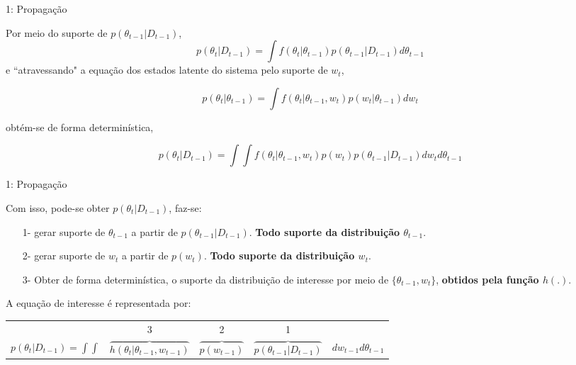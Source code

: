 \documentclass{beamer}
\begin{document}
\begin{frame}{1: Propagação}

Por meio do suporte de $p(\theta_{t-1}|D_{t-1})$,
$$
p(\theta_t|D_{t-1}) = \int f(\theta_t|\theta_{t-1})p(\theta_{t-1}|D_{t-1})d\theta_{t-1}
$$
\pause
e ``atravessando" a equação dos estados latente do sistema pelo suporte de $w_t$, 

$$
p(\theta_t|\theta_{t-1}) = \int f(\theta_t|\theta_{t-1},w_{t})p(w_{t}|\theta_{t-1})dw_{t}
$$
\pause

obtém-se de forma determinística,

$$
p(\theta_t|D_{t-1}) = \int \int f(\theta_t|\theta_{t-1},w_{t})p(w_{t})p(\theta_{t-1}|D_{t-1})dw_{t}d\theta_{t-1}
$$


\end{frame}



\begin{frame}{1: Propagação}


Com isso, pode-se obter $p(\theta_t|D_{t-1})$, faz-se:
\pause
\begin{itemize}
\item[1-] gerar suporte de  $\theta_{t-1}$ a partir de $p(\theta_{t-1}|D_{t-1})$. \textbf{Todo suporte da distribuição $\theta_{t-1}$}.

\pause


\item[2-] gerar suporte de $w_{t}$ a partir de $p(w_{t})$. \textbf{Todo suporte da distribuição $w_{t}$}.

\pause

\item[3-]  Obter de forma determinística, o suporte da distribuição de interesse por meio de $\{\theta_{t-1},w_{t}\}$,  \textbf{obtidos pela função $h(.)$}.
\end{itemize}

\pause


A equação de interesse é representada por:
\begin{small}

\begin{tabular}{ccccc}
 & 3 & 2 & 1 & \\
$p(\theta_t|D_{t-1}) = \int \int $& $\overbrace{h(\theta_t|\theta_{t-1},w_{t-1})} $& $\overbrace{p(w_{t-1})} $& $\overbrace{p(\theta_{t-1}|D_{t-1})} $&$ dw_{t-1}d\theta_{t-1}$
\end{tabular}

\end{small}

\end{frame}
\end{document}
